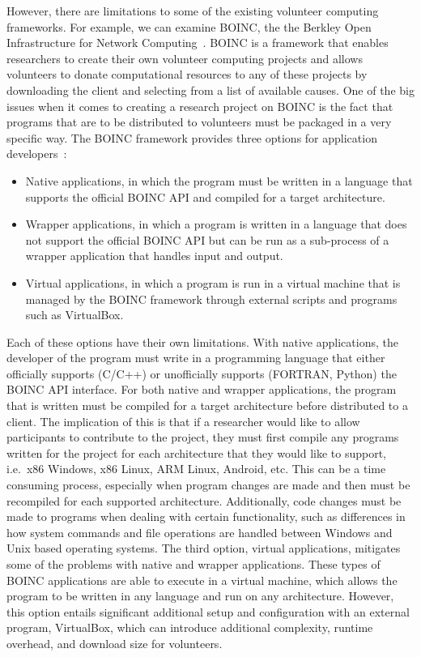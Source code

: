 \documentclass[11pt]{article}
\begin{document}
However, there are limitations to some of the existing volunteer computing frameworks. For example, we can examine BOINC, the the Berkley Open Infrastructure for Network Computing~\cite{Anderson2020}. BOINC is a framework that enables researchers to create their own volunteer computing projects and allows volunteers to donate computational resources to any of these projects by downloading the client and selecting from a list of available causes. One of the big issues when it comes to creating a research project on BOINC is the fact that programs that are to be distributed to volunteers must be packaged in a very specific way. The BOINC framework provides three options for application developers~\cite{boincAppsIntro}:

\begin{itemize}
    \item Native applications, in which the program must be written in a language that supports the official BOINC API and compiled for a target architecture.
    \item Wrapper applications, in which a program is written in a language that does not support the official BOINC API but can be run as a sub-process of a wrapper application that handles input and output.
    \item Virtual applications, in which a program is run in a virtual machine that is managed by the BOINC framework through external scripts and programs such as VirtualBox.
\end{itemize}

Each of these options have their own limitations. With native applications, the developer of the program must write in a programming language that either officially supports (C/C++) or unofficially supports (FORTRAN, Python) the BOINC API interface. For both native and wrapper applications, the program that is written must be compiled for a target architecture before distributed to a client. The implication of this is that if a researcher would like to allow participants to contribute to the project, they must first compile any programs written for the project for each architecture that they would like to support, i.e.\ x86 Windows, x86 Linux, ARM Linux, Android, etc. This can be a time consuming process, especially when program changes are made and then must be recompiled for each supported architecture. Additionally, code changes must be made to programs when dealing with certain functionality, such as differences in how system commands and file operations are handled between Windows and Unix based operating systems. The third option, virtual applications, mitigates some of the problems with native and wrapper applications. These types of BOINC applications are able to execute in a virtual machine, which allows the program to be written in any language and run on any architecture. However, this option entails significant additional setup and configuration with an external program, VirtualBox, which can introduce additional complexity, runtime overhead, and download size for volunteers.
\end{document}
